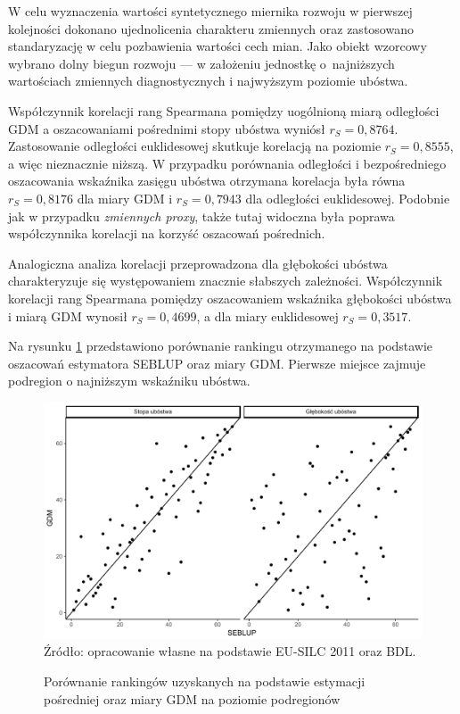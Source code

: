 W celu wyznaczenia wartości syntetycznego miernika rozwoju w pierwszej kolejności dokonano ujednolicenia charakteru zmiennych oraz zastosowano standaryzację w celu pozbawienia wartości cech mian. Jako obiekt wzorcowy wybrano dolny biegun rozwoju --- w założeniu jednostkę o~najniższych wartościach zmiennych diagnostycznych i najwyższym poziomie ubóstwa.

Współczynnik korelacji rang Spearmana pomiędzy uogólnioną miarą odległości GDM a oszacowaniami pośrednimi stopy ubóstwa wyniósł $r_S=0,8764$. Zastosowanie odległości euklidesowej skutkuje korelacją na poziomie $r_S=0,8555$, a więc nieznacznie niższą. W przypadku porównania odległości i bezpośredniego oszacowania wskaźnika zasięgu ubóstwa otrzymana korelacja była równa $r_S=0,8176$ dla miary GDM i $r_S=0,7943$ dla odległości euklidesowej. Podobnie jak w przypadku \textit{zmiennych proxy}, także tutaj widoczna była poprawa współczynnika korelacji na korzyść oszacowań pośrednich.

Analogiczna analiza korelacji przeprowadzona dla głębokości ubóstwa charakteryzuje się występowaniem znacznie słabszych zależności. Współczynnik korelacji rang Spearmana pomiędzy oszacowaniem wskaźnika głębokości ubóstwa i miarą GDM wynosił $r_S=0,4699$, a dla miary euklidesowej $r_S=0,3517$. 

Na rysunku \ref{fig:podreg-gdm} przedstawiono porównanie rankingu otrzymanego na podstawie oszacowań estymatora SEBLUP oraz miary GDM. Pierwsze miejsce zajmuje podregion o najniższym wskaźniku ubóstwa. 

\begin{figure}[ht]
\caption{Porównanie rankingów uzyskanych na podstawie estymacji pośredniej oraz miary GDM na poziomie podregionów}
\centering
\includegraphics[width=\textwidth]{05_wykresy/podreg_gdm-1.pdf}\\
\small{Źródło: opracowanie własne na podstawie EU-SILC 2011 oraz BDL.}
\label{fig:podreg-gdm}
\end{figure}

